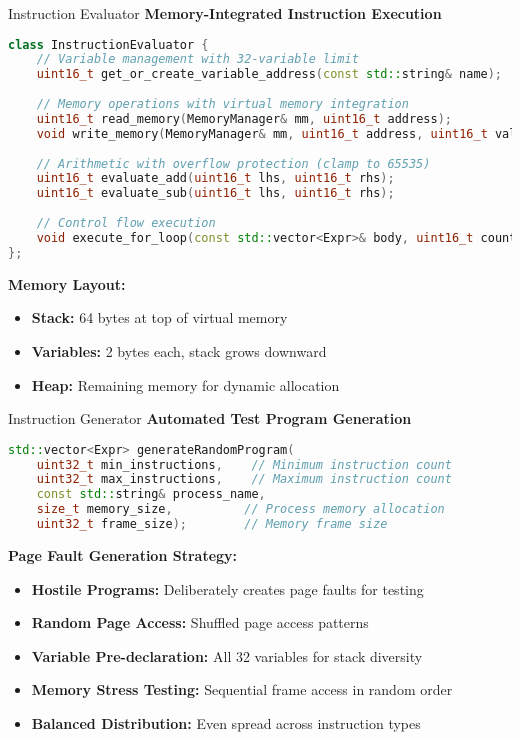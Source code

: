 \documentclass[10pt]{beamer}
\begin{document}
\begin{frame}[fragile]{Instruction Evaluator}
    \textbf{Memory-Integrated Instruction Execution}
    \begin{lstlisting}[language=C++]
class InstructionEvaluator {
    // Variable management with 32-variable limit
    uint16_t get_or_create_variable_address(const std::string& name);
    
    // Memory operations with virtual memory integration
    uint16_t read_memory(MemoryManager& mm, uint16_t address);
    void write_memory(MemoryManager& mm, uint16_t address, uint16_t value);
    
    // Arithmetic with overflow protection (clamp to 65535)
    uint16_t evaluate_add(uint16_t lhs, uint16_t rhs);
    uint16_t evaluate_sub(uint16_t lhs, uint16_t rhs);
    
    // Control flow execution
    void execute_for_loop(const std::vector<Expr>& body, uint16_t count);
};
    \end{lstlisting}
    
    \textbf{Memory Layout:}
    \begin{itemize}
        \item \textbf{Stack:} 64 bytes at top of virtual memory
        \item \textbf{Variables:} 2 bytes each, stack grows downward
        \item \textbf{Heap:} Remaining memory for dynamic allocation
    \end{itemize}
\end{frame}

\begin{frame}[fragile]{Instruction Generator}
    \textbf{Automated Test Program Generation}
    \begin{lstlisting}[language=C++]
std::vector<Expr> generateRandomProgram(
    uint32_t min_instructions,    // Minimum instruction count
    uint32_t max_instructions,    // Maximum instruction count
    const std::string& process_name,
    size_t memory_size,          // Process memory allocation
    uint32_t frame_size);        // Memory frame size
    \end{lstlisting}
    
    \vspace{0.3cm}
    \textbf{Page Fault Generation Strategy:}
    \begin{itemize}
        \item \textbf{Hostile Programs:} Deliberately creates page faults for testing
        \item \textbf{Random Page Access:} Shuffled page access patterns
        \item \textbf{Variable Pre-declaration:} All 32 variables for stack diversity
        \item \textbf{Memory Stress Testing:} Sequential frame access in random order
        \item \textbf{Balanced Distribution:} Even spread across instruction types
    \end{itemize}
\end{frame}
\end{document}
